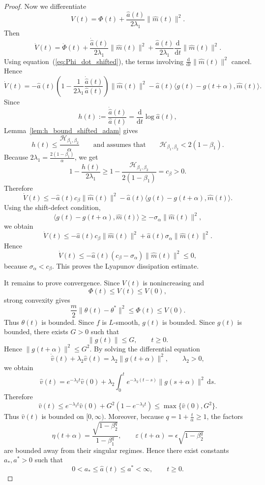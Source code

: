 \documentclass{article} %
\begin{document}
\begin{proof}
Now we differentiate
\[
    V(t)
    =
    \Phi(t)
    +
    \frac{\widehat a(t)}{2\lambda_1}
    \|\widehat m(t)\|^2.
\]
Then
\[
    \dot V(t)
    =
    \dot\Phi(t)
    +
    \frac{\dot{\widehat a}(t)}{2\lambda_1}
    \|\widehat m(t)\|^2
    +
    \frac{\widehat a(t)}{2\lambda_1}
    \frac{\mathrm d}{\mathrm dt}\|\widehat m(t)\|^2.
\]
Using equation~(\ref{eq:Phi_dot_shifted}), the terms involving $\frac{\mathrm d}{\mathrm dt}\|\widehat m(t)\|^2$ cancel. Hence
\[
    \dot V(t)
    =
    -
    \widehat a(t)
    \left(
        1-
        \frac{1}{2\lambda_1}
        \frac{\dot{\widehat a}(t)}{\widehat a(t)}
    \right)
    \|\widehat m(t)\|^2
    -
    \widehat a(t)
    \langle g(t)-g(t+\alpha),\widehat m(t)\rangle.
\]
Since
\[
    h(t):=
    \frac{\dot{\widehat a}(t)}{\widehat a(t)}
    =
    \frac{\mathrm d}{\mathrm dt}\log\widehat a(t),
\]
Lemma~\ref{lem:h_bound_shifted_adam} gives
\[
    h(t)
    \leq
    \frac{\mathcal H_{\beta_1,\beta_2}}{\alpha}
    \qquad 
    \text{and assumes that}
    \qquad
    \mathcal H_{\beta_1,\beta_2} < 2(1-\beta_1).
\]
Because $2\lambda_1 = \frac{2(1-\beta_1)}{\alpha}$, we get
\[
    1-\frac{h(t)}{2\lambda_1}
    \geq
    1-
    \frac{\mathcal H_{\beta_1,\beta_2}}
    {2(1-\beta_1)}
    =
    c_\beta > 0.
\]
Therefore
\[
    \dot V(t)
    \leq
    -
    \widehat a(t)c_\beta\|\widehat m(t)\|^2
    -
    \widehat a(t)
    \langle g(t)-g(t+\alpha),\widehat m(t)\rangle.
\]
Using the shift-defect condition,
\[
    \langle g(t)-g(t+\alpha),\widehat m(t)\rangle
    \geq
    -\sigma_\alpha\|\widehat m(t)\|^2,
\]
we obtain
\[
    \dot V(t)
    \leq
    -
    \widehat a(t)c_\beta\|\widehat m(t)\|^2
    +
    \widehat a(t)\sigma_\alpha\|\widehat m(t)\|^2.
\]
Hence
\[
    \dot V(t)
    \leq
    -
    \widehat a(t)
    (c_\beta-\sigma_\alpha)
    \|\widehat m(t)\|^2
    \leq0,
\]
because \(\sigma_\alpha<c_\beta\). This proves the Lyapunov dissipation estimate.

It remains to prove convergence. Since \(V(t)\) is nonincreasing and
\[
    \Phi(t)\leq V(t)\leq V(0),
\]
strong convexity gives
\[
    \frac m2\|\theta(t)-\theta^*\|^2
    \leq
    \Phi(t)
    \leq
    V(0).
\]
Thus \(\theta(t)\) is bounded. Since \(f\) is \(L\)-smooth, \(g(t)\) is bounded. Since \(g(t)\) is bounded, there exists \(G>0\) such that
\[
    \|g(t)\|\leq G,\qquad t\geq0.
\]
Hence \(\|g(t+\alpha)\|^2\leq G^2\). By solving the differential equation
\[
    \dot{\widehat v}(t)+\lambda_2\widehat v(t)
    =
    \lambda_2\|g(t+\alpha)\|^2,
    \qquad \lambda_2>0,
\]
we obtain
\[
    \widehat v(t)
    =
    e^{-\lambda_2 t}\widehat v(0)
    +
    \lambda_2
    \int_0^t
    e^{-\lambda_2(t-s)}
    \|g(s+\alpha)\|^2\,\mathrm ds.
\]
Therefore
\[
    \widehat v(t)
    \leq
    e^{-\lambda_2 t}\widehat v(0)
    +
    G^2(1-e^{-\lambda_2 t})
    \leq
    \max\{\widehat v(0),G^2\}.
\]
Thus \(\widehat v(t)\) is bounded on \([0,\infty)\). Moreover, because $q=1+\frac{t}{\alpha}\geq1$, the factors
\[
    \eta(t+\alpha)
    =
    \frac{\sqrt{1-\beta_2^q}}{1-\beta_1^q},
    \qquad
    \varepsilon(t+\alpha)
    =
    \epsilon\sqrt{1-\beta_2^q}
\]
are bounded away from their singular regimes. Hence there exist constants \(a_*,a^*>0\) such that
\[
    0<a_*\leq \widehat a(t)\leq a^*<\infty,
    \qquad t\geq0.
\]


\end{proof}
\end{document}
